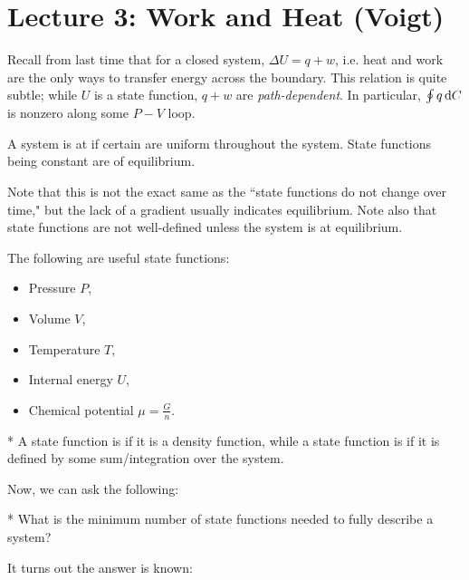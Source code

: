 \section*{Lecture 3: Work and Heat (Voigt)}
\setcounter{section}{3}
\setcounter{defn}{0}
\setcounter{subsection}{0}
\setcounter{defncontainer}{0}

Recall from last time that for a closed system, $\Delta U = q + w$, i.e. heat and work are the only ways to transfer energy across the boundary.
This relation is quite subtle; while $U$ is a state function, $q + w$ are \emph{path-dependent}. In particular, $\oint q\,\text dC$ is nonzero along some $P-V$ loop.

\begin{defn}
	A system is at  if certain  are uniform throughout the system. State functions being constant are  of equilibrium.
\end{defn}

Note that this is not the exact same as the ``state functions do not change over time," but the lack of a gradient usually indicates equilibrium.
Note also that state functions are not well-defined unless the system is at equilibrium.

\begin{exm}
	The following are useful state functions:
	\begin{itemize}
		\item Pressure $P$,
		\item Volume $V$,
		\item Temperature $T$, 
		\item Internal energy $U$,
		\item Chemical potential $\mu = \frac{G}{n}$.
	\end{itemize}
\end{exm}

\begin{defn}*
	A state function is  if it is a density function, while a state function is  if it is defined by some sum/integration over the system.
\end{defn}

Now, we can ask the following:

\begin{que}*
	What is the minimum number of state functions needed to fully describe a system?
\end{que}

It turns out the answer is known:

